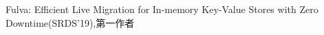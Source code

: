 \cventry
{Fulva: Efficient Live Migration for In-memory Key-Value Stores with Zero Downtime(SRDS'19),第一作者} %
